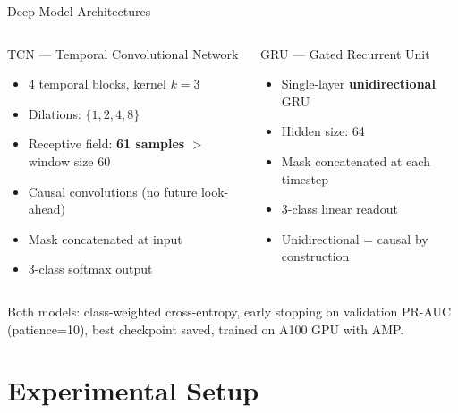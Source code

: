 \documentclass[aspectratio=169,10pt]{beamer}
\begin{document}
\begin{frame}{Deep Model Architectures}
  \begin{columns}
      \begin{block}{TCN — Temporal Convolutional Network}
        \begin{itemize}
          \item 4 temporal blocks, kernel $k=3$
          \item Dilations: $\{1, 2, 4, 8\}$
          \item Receptive field: \textbf{61 samples} $>$ window size 60
          \item Causal convolutions (no future look-ahead)
          \item Mask concatenated at input
          \item 3-class softmax output
        \end{itemize}
      \end{block}
      \begin{block}{GRU — Gated Recurrent Unit}
        \begin{itemize}
          \item Single-layer \textbf{unidirectional} GRU
          \item Hidden size: 64
          \item Mask concatenated at each timestep
          \item 3-class linear readout
          \item Unidirectional = causal by construction
        \end{itemize}
      \end{block}
  \end{columns}
  \vspace{0.5em}
  Both models: class-weighted cross-entropy, early stopping on validation PR-AUC (patience=10), best checkpoint saved, trained on A100 GPU with AMP.
\end{frame}

\section{Experimental Setup}
\end{document}
